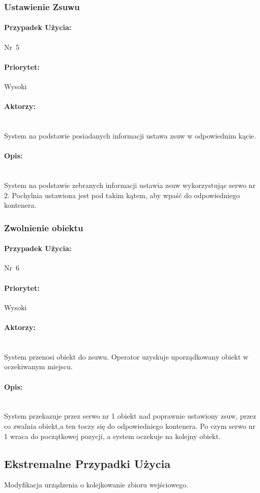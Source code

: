 \documentclass[12pt]{article}
\begin{document}
\subsubsection{Ustawienie Zsuwu}
\paragraph{Przypadek Użycia:}\mbox{Nr 5}
\paragraph{Priorytet:}\mbox{Wysoki}	
\paragraph{Aktorzy:}\mbox{} \\
System na podstawie posiadanych informacji ustawa zsuw w odpowiednim kącie.
\paragraph{Opis:}\mbox{} \\
System na podstawie zebranych informacji ustawia zsuw wykorzystując serwo nr 2. Pochylnia ustawiona jest pod takim kątem, aby wpaść do odpowiedniego kontenera.

\subsubsection{Zwolnienie obiektu}
\paragraph{Przypadek Użycia:}\mbox{Nr 6}
\paragraph{Priorytet:}\mbox{Wysoki}	
\paragraph{Aktorzy:}\mbox{} \\
System przenosi obiekt do zsuwu. 
Operator uzyskuje uporządkowany obiekt w oczekiwanym miejscu.
\paragraph{Opis:}\mbox{} \\
System przekazuje przez serwo nr 1 obiekt nad poprawnie ustawiony zsuw, przez  co zwalnia obiekt,a ten toczy się do odpowiedniego kontenera. Po czym serwo nr 1 wraca do początkowej pozycji, a system oczekuje na kolejny obiekt.
\subsection{Ekstremalne Przypadki Użycia}
Modyfikacja urządzenia o kolejkowanie zbioru wejściowego.
\end{document}

